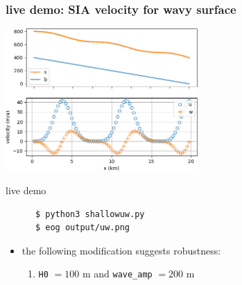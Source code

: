 \documentclass[10pt,dvipsnames]{beamer}
\begin{document}
\begin{frame}[fragile]
\frametitle{live demo: SIA velocity for wavy surface}

\begin{center}
\includegraphics[width=0.55\textwidth]{uw}
\end{center}

\begin{block}{live demo}
\begin{verbatim}
      $ python3 shallowuw.py
      $ eog output/uw.png
\end{verbatim}

\vspace{-2mm}
\begin{itemize}
\item the following modification suggests robustness:
    \begin{enumerate}
    \item \texttt{H0} $=100$ m and \texttt{wave\_amp} $=200$ m
    \end{enumerate}
\end{itemize}
\end{block}
\end{frame}
\end{document}
